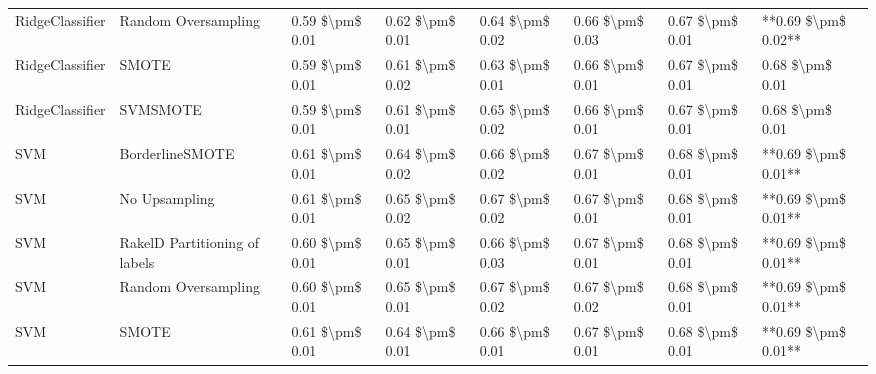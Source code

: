 \begin{tabular}{llllllll}
                RidgeClassifier &           Random Oversampling & 0.59 \$\textbackslash pm\$ 0.01 &           0.62 \$\textbackslash pm\$ 0.01 &       0.64 \$\textbackslash pm\$ 0.02 &        0.66 \$\textbackslash pm\$ 0.03 &                         0.67 \$\textbackslash pm\$ 0.01 & **0.69 \$\textbackslash pm\$ 0.02** \\
                RidgeClassifier &                         SMOTE & 0.59 \$\textbackslash pm\$ 0.01 &           0.61 \$\textbackslash pm\$ 0.02 &       0.63 \$\textbackslash pm\$ 0.01 &        0.66 \$\textbackslash pm\$ 0.01 &                         0.67 \$\textbackslash pm\$ 0.01 &     0.68 \$\textbackslash pm\$ 0.01 \\
                RidgeClassifier &                      SVMSMOTE & 0.59 \$\textbackslash pm\$ 0.01 &           0.61 \$\textbackslash pm\$ 0.01 &       0.65 \$\textbackslash pm\$ 0.02 &        0.66 \$\textbackslash pm\$ 0.01 &                         0.67 \$\textbackslash pm\$ 0.01 &     0.68 \$\textbackslash pm\$ 0.01 \\
                            SVM &               BorderlineSMOTE & 0.61 \$\textbackslash pm\$ 0.01 &           0.64 \$\textbackslash pm\$ 0.02 &       0.66 \$\textbackslash pm\$ 0.02 &        0.67 \$\textbackslash pm\$ 0.01 &                         0.68 \$\textbackslash pm\$ 0.01 & **0.69 \$\textbackslash pm\$ 0.01** \\
                            SVM &                 No Upsampling & 0.61 \$\textbackslash pm\$ 0.01 &           0.65 \$\textbackslash pm\$ 0.02 &       0.67 \$\textbackslash pm\$ 0.02 &        0.67 \$\textbackslash pm\$ 0.01 &                         0.68 \$\textbackslash pm\$ 0.01 & **0.69 \$\textbackslash pm\$ 0.01** \\
                            SVM & RakelD Partitioning of labels & 0.60 \$\textbackslash pm\$ 0.01 &           0.65 \$\textbackslash pm\$ 0.01 &       0.66 \$\textbackslash pm\$ 0.03 &        0.67 \$\textbackslash pm\$ 0.01 &                         0.68 \$\textbackslash pm\$ 0.01 & **0.69 \$\textbackslash pm\$ 0.01** \\
                            SVM &           Random Oversampling & 0.60 \$\textbackslash pm\$ 0.01 &           0.65 \$\textbackslash pm\$ 0.01 &       0.67 \$\textbackslash pm\$ 0.02 &        0.67 \$\textbackslash pm\$ 0.02 &                         0.68 \$\textbackslash pm\$ 0.01 & **0.69 \$\textbackslash pm\$ 0.01** \\
                            SVM &                         SMOTE & 0.61 \$\textbackslash pm\$ 0.01 &           0.64 \$\textbackslash pm\$ 0.01 &       0.66 \$\textbackslash pm\$ 0.01 &        0.67 \$\textbackslash pm\$ 0.01 &                         0.68 \$\textbackslash pm\$ 0.01 & **0.69 \$\textbackslash pm\$ 0.01** \\

\end{tabular}
